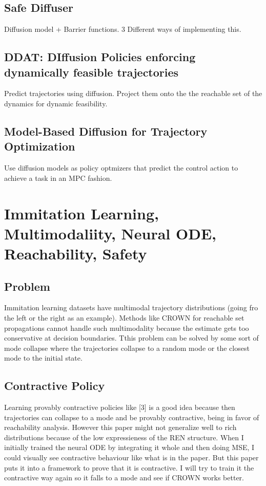 \documentclass[12pt]{article}
\begin{document}
\subsection{Safe Diffuser}
Diffusion model + Barrier functions. 3 Different ways of implementing this.

\subsection{DDAT: DIffusion Policies enforcing dynamically feasible trajectories}
Predict trajectories using diffusion. Project them onto the the reachable set of the dynamics for dynamic feasibility. 

\subsection{Model-Based Diffusion for Trajectory Optimization}
Use diffusion models as policy optmizers that predict the control action to achieve a task in an MPC fashion.

\section{Immitation Learning, Multimodaliity, Neural ODE, Reachability, Safety}
\subsection{Problem}
Immitation learning datasets have multimodal trajectory distributions (going fro the left or the right as an example). Methods like CROWN for reachable set propagations cannot handle such multimodality because the estimate gets too conservative at decision boundaries.
Tthis problem can be solved by some sort of mode collapse where the trajectories collapse to a random mode or the closest mode to the initial state.   

\subsection{Contractive Policy}
Learning provably contractive policies like [3] is a good idea because then trajectories can collapse to a mode and be provably contractive, being in favor of reachability analysis. 
However this paper might not generalize well to rich distributions because of the low expressieness of the REN structure. When I initially trained the neural ODE by integrating it whole and then doing MSE, I could visually see contractive behaviour like what is in the paper.
But this paper puts it into a framework to prove that it is contractive. I will try to train it the contractive way again so it falls to a mode and see if CROWN works better. 
\end{document}
